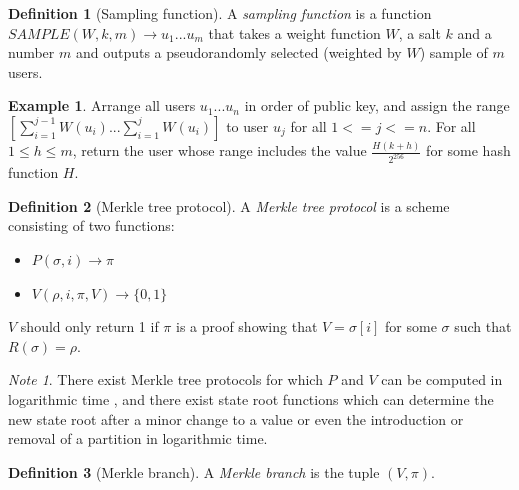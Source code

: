 \documentclass[11pt,a4paper]{report}
\theoremstyle{plain}
\theoremstyle{definition}
\newtheorem{defn}{Definition}[chapter]
\newtheorem{exmp}{Example}[section]
\theoremstyle{remark}
\newtheorem*{note}{Note}
\begin{document}
\begin{defn}[Sampling function]
A \emph{sampling function} is a function $SAMPLE(W, k, m) \rightarrow {u_1 ... u_m}$ that takes a weight function $W$, a salt $k$ and a number $m$ and outputs a pseudorandomly selected (weighted by $W$) sample of $m$ users.
\end{defn}

\begin{exmp}
Arrange all users $u_1 ... u_n$ in order of public key, and assign the range $[\sum_{i=1}^{j-1} W(u_i)...\sum_{i=1}^j W(u_i)]$ to user $u_j$ for all $1 <= j <= n$. For all $1 \le h \le m$, return the user whose range includes the value $\frac{H(k + h)}{2^{256}}$ for some hash function $H$.
\end{exmp}

\begin{defn}[Merkle tree protocol]
A \emph{Merkle tree protocol} is a scheme consisting of two functions:
\begin{itemize}
\item
$P(\sigma, i) \rightarrow \pi$
\item
$V(\rho, i, \pi, V) \rightarrow \{0, 1\}$
\end{itemize}
$V$ should only return 1 if $\pi$ is a proof showing that $V = \sigma[i]$ for some $\sigma$ such that $R(\sigma) = \rho$.
\end{defn}

\begin{note}
There exist Merkle tree protocols for which $P$ and $V$ can be computed in logarithmic time \cite{merkle}, and there exist state root functions which can determine the new state root after a minor change to a value or even the introduction or removal of a partition in logarithmic time.
\end{note}

\begin{defn}[Merkle branch]
A \emph{Merkle branch} is the tuple $(V, \pi)$.
\end{defn}
\end{document}
